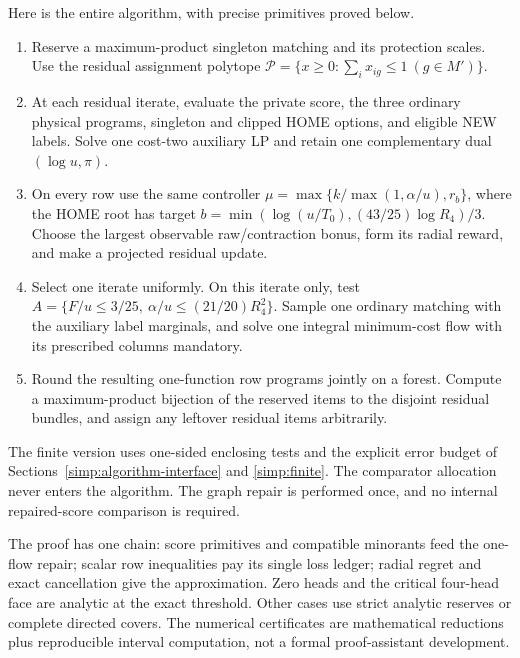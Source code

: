 \documentclass[10pt]{article}
\begin{document}
Here is the entire algorithm, with precise primitives proved below.
\begin{enumerate}
\item Reserve a maximum-product singleton matching and its protection
scales. Use the residual assignment polytope
$\mathcal P=\{x\ge0:\sum_i x_{ig}\le1\ (g\in M')\}$.
\item At each residual iterate, evaluate the private score, the three
ordinary physical programs, singleton and clipped HOME options, and eligible
NEW labels. Solve one cost-two auxiliary LP and retain one complementary
dual $(\log u,\pi)$.
\item On every row use the same controller
$\mu=\max\{k/\max(1,\alpha/u),r_b\}$, where the HOME root has target
$b=\min(\log(u/T_0),(43/25)\log R_4)/3$.
Choose the largest observable raw/contraction bonus, form its radial reward,
and make a projected residual update.
\item Select one iterate uniformly. On this iterate only, test
$A=\{F/u\le3/25,\ \alpha/u\le(21/20)R_4^2\}$.
Sample one ordinary matching with the auxiliary label marginals, and solve
one integral minimum-cost flow with its prescribed columns mandatory.
\item Round the resulting one-function row programs jointly on a forest.
Compute a maximum-product bijection of the reserved items to the disjoint
residual bundles, and assign any leftover residual items arbitrarily.
\end{enumerate}
The finite version uses one-sided enclosing tests and the explicit error
budget of Sections~\ref{simp:algorithm-interface} and \ref{simp:finite}.
The comparator allocation never enters the algorithm. The graph repair is
performed once, and no internal repaired-score comparison is required.

The proof has one chain: score primitives and compatible minorants feed the
one-flow repair; scalar row inequalities pay its single loss ledger;
radial regret and exact cancellation give the approximation. Zero heads
and the critical four-head face are analytic at the exact threshold.
Other cases use strict analytic reserves or complete directed covers.
The numerical certificates are mathematical reductions plus reproducible
interval computation, not a formal proof-assistant development.













\end{document}
